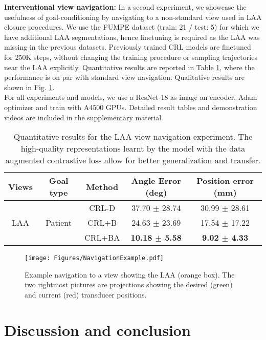 \textbf{Interventional view navigation:} In a second experiment, we showcase the usefulness of goal-conditioning by navigating to a non-standard view used in LAA closure procedures. We use the FUMPE dataset \cite{fumpe} (train: 21 / test: 5) for which we have additional LAA segmentations, hence finetuning is required as the LAA was missing in the previous datasets. Previously trained CRL models are finetuned for 250K steps, without changing the training procedure or sampling trajectories near the LAA explicitly. Quantitative results are reported in Table \ref{table:laa_experiment}, where the performance is on par with standard view navigation. Qualitative results are shown in Fig. \ref{fig:navigation_example}.\\
For all experiments and models, we use a ResNet-18 \cite{he2015} as image an encoder, Adam optimizer \cite{Kingma2014AdamAM} and train with A4500 GPUs. Detailed result tables and demonstration videos are included in the supplementary material.

\begin{table}[t!]
\centering
\caption{Quantitative results for the LAA view navigation experiment. The high-quality representations learnt by the model with the data augmented contrastive loss allow for better generalization and transfer.}
\begin{tabular}{|c|c|c|c|c|}
\hline
Views & Goal type & Method & Angle Error (deg) & Position error (mm) \\
\hline
\hline
 \multirow{3}{*}{LAA} & \multirow{3}{*}{Patient} & CRL-D \cite{Eysenbach2022ContrastiveLA} & 37.70 $\pm$ 28.74 & 30.99 $\pm$ 28.61\\
\cline{3-3}\cline{4-5}
& &  CRL+B & 24.63 $\pm$ 23.69 & 17.54 $\pm$ 17.22\\
\cline{3-3}\cline{4-5}
& &  CRL+BA & \textbf{10.18 $\pm$ 5.58} & \textbf{9.02 $\pm$ 4.33}\\
\hline
\end{tabular}
\label{table:laa_experiment}
\end{table}


\begin{figure}[h!]
\centering
\texttt{[image: Figures/NavigationExample.pdf]}
\caption{Example navigation to a view showing the LAA (orange box). The two rightmost pictures are projections showing the desired (green) and current (red) transducer positions.}
\label{fig:navigation_example}
\end{figure}

\section{Discussion and conclusion}

